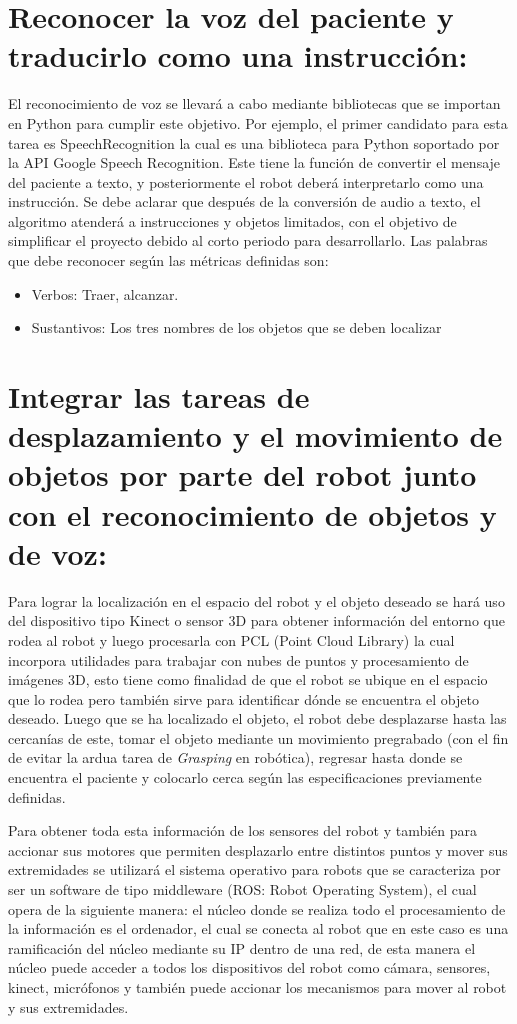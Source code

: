 \section{Reconocer la voz del paciente y traducirlo como una instrucción:}
El reconocimiento de voz se llevará a cabo
mediante bibliotecas que se importan en Python para cumplir este objetivo. Por ejemplo, el primer candidato para 
esta tarea es SpeechRecognition la cual es una biblioteca para Python soportado por la API Google Speech Recognition.
Este tiene la función de convertir el mensaje del paciente a texto, y posteriormente el robot deberá interpretarlo
como una instrucción. Se debe aclarar que después de la conversión de audio a texto, el algoritmo atenderá a
instrucciones y objetos limitados, con el objetivo de simplificar el proyecto debido al corto periodo para 
desarrollarlo. Las palabras que debe reconocer según las métricas definidas son: 
    \begin{itemize}
        \item Verbos: Traer, alcanzar.
        \item Sustantivos: Los tres nombres de los objetos que se deben localizar
    \end{itemize}
    
    
\section{ Integrar las tareas de desplazamiento y el movimiento de objetos por parte del robot junto con 
    el reconocimiento de objetos y de voz: }
Para lograr la localización en el espacio del robot y el objeto 
deseado se hará uso del dispositivo tipo Kinect o sensor 3D para obtener información del entorno que rodea
al robot y luego procesarla con PCL (Point Cloud Library) la cual incorpora utilidades para trabajar con
nubes de puntos y procesamiento de imágenes 3D, esto tiene como finalidad de que el robot se ubique en el 
espacio que lo rodea pero también sirve para identificar dónde se encuentra el objeto deseado. Luego que se 
ha localizado el objeto, el robot debe desplazarse hasta las cercanías de este, tomar el objeto mediante un 
movimiento pregrabado (con el fin de evitar la ardua tarea de \textit{Grasping} en robótica), regresar hasta 
donde se encuentra el paciente y colocarlo cerca según las especificaciones previamente definidas.
    
Para obtener toda esta información de los sensores del robot y también para accionar sus motores que permiten
desplazarlo entre distintos puntos y mover sus extremidades se utilizará el sistema operativo para robots que
se caracteriza por ser un software de tipo middleware (ROS: Robot Operating System), el cual opera de la 
siguiente manera: el núcleo donde se realiza todo el procesamiento de la información es el ordenador, el 
cual se conecta al robot que en este caso es una ramificación del núcleo mediante su IP dentro de una red,
de esta manera el núcleo puede acceder a todos los dispositivos del robot como cámara, sensores, kinect,
micrófonos y también puede accionar los mecanismos para mover al robot y sus extremidades.
    
